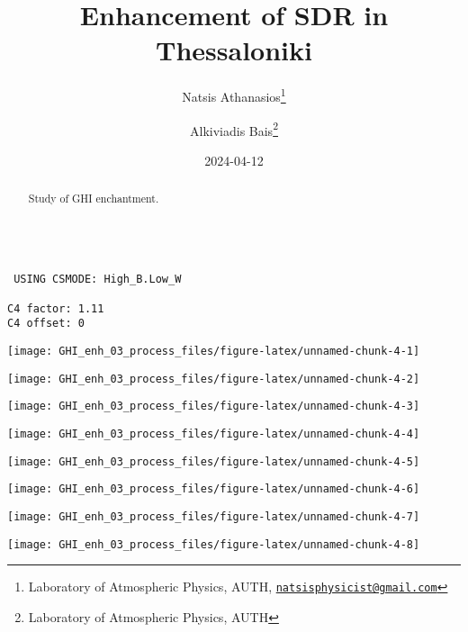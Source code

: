 \documentclass[
  10pt,
  a4paper,oneside]{article}
\title{Enhancement of SDR in Thessaloniki}
\author{Natsis Athanasios\footnote{Laboratory of Atmospheric Physics, AUTH, \href{mailto:natsisphysicist@gmail.com}{\nolinkurl{natsisphysicist@gmail.com}}} \and Alkiviadis Bais\footnote{Laboratory of Atmospheric Physics, AUTH}}
\date{2024-04-12}
\begin{document}
\maketitle
\begin{abstract}
Study of GHI enchantment.
\end{abstract}

{
\hypersetup{linkcolor=}
\setcounter{tocdepth}{4}
\tableofcontents
}
\begin{verbatim}

 USING CSMODE: High_B.Low_W 

C4 factor: 1.11 
C4 offset: 0 
\end{verbatim}

\begin{center}\texttt{[image: GHI\_enh\_03\_process\_files/figure-latex/unnamed-chunk-4-1]} \end{center}

\begin{center}\texttt{[image: GHI\_enh\_03\_process\_files/figure-latex/unnamed-chunk-4-2]} \end{center}

\begin{center}\texttt{[image: GHI\_enh\_03\_process\_files/figure-latex/unnamed-chunk-4-3]} \end{center}

\begin{center}\texttt{[image: GHI\_enh\_03\_process\_files/figure-latex/unnamed-chunk-4-4]} \end{center}

\begin{center}\texttt{[image: GHI\_enh\_03\_process\_files/figure-latex/unnamed-chunk-4-5]} \end{center}

\begin{center}\texttt{[image: GHI\_enh\_03\_process\_files/figure-latex/unnamed-chunk-4-6]} \end{center}

\begin{center}\texttt{[image: GHI\_enh\_03\_process\_files/figure-latex/unnamed-chunk-4-7]} \end{center}

\begin{center}\texttt{[image: GHI\_enh\_03\_process\_files/figure-latex/unnamed-chunk-4-8]} \end{center}
\end{document}
